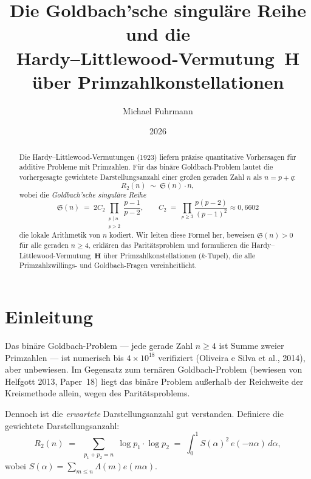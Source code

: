 \documentclass[12pt,a4paper]{amsart}
\theoremstyle{definition}
\newcommand{\eq}[1]{e\!\left(#1\right)}
\begin{document}
\title{Die Goldbach'sche singuläre Reihe und die\\
       Hardy--Littlewood-Vermutung~$\mathbf{H}$\\
       über Primzahlkonstellationen}

\author{Michael Fuhrmann}
\address{Specialist Mathematics Project, Build 80}
\date{2026}

\begin{abstract}
Die Hardy--Littlewood-Vermutungen (1923) liefern präzise quantitative
Vorhersagen für additive Probleme mit Primzahlen.  Für das binäre Goldbach-Problem
lautet die vorhergesagte gewichtete Darstellungsanzahl einer großen geraden
Zahl $n$ als $n = p + q$:
\[
  R_2(n) \;\sim\; \mathfrak{S}(n) \cdot n,
\]
wobei die \emph{Goldbach'sche singuläre Reihe}
\[
  \mathfrak{S}(n)
  \;=\; 2 C_2 \prod_{\substack{p \mid n \\ p > 2}} \frac{p-1}{p-2},
  \qquad
  C_2 \;=\; \prod_{p \geq 3} \frac{p(p-2)}{(p-1)^2} \approx 0{,}6602
\]
die lokale Arithmetik von $n$ kodiert.  Wir leiten diese Formel her,
beweisen $\mathfrak{S}(n) > 0$ für alle geraden $n \geq 4$, erklären
das Paritätsproblem und formulieren die Hardy--Littlewood-Vermutung~$\mathbf{H}$
über Primzahlkonstellationen ($k$-Tupel), die alle Primzahlzwillings-
und Goldbach-Fragen vereinheitlicht.
\end{abstract}

\maketitle
\tableofcontents

\section{Einleitung}

Das binäre Goldbach-Problem — jede gerade Zahl $n \geq 4$ ist Summe
zweier Primzahlen — ist numerisch bis $4 \times 10^{18}$ verifiziert
(Oliveira e Silva et al., 2014), aber unbewiesen.  Im Gegensatz zum
ternären Goldbach-Problem (bewiesen von Helfgott 2013, Paper~18) liegt
das binäre Problem außerhalb der Reichweite der Kreismethode allein,
wegen des Paritätsproblems.

Dennoch ist die \emph{erwartete} Darstellungsanzahl gut verstanden.
Definiere die gewichtete Darstellungsanzahl:
\[
  R_2(n) \;=\; \sum_{\substack{p_1 + p_2 = n}} \log p_1 \cdot \log p_2
  \;=\; \int_0^1 S(\alpha)^2\, \eq{-n\alpha}\, d\alpha,
\]
wobei $S(\alpha) = \sum_{m \leq n} \Lambda(m) \eq{m\alpha}$.
\end{document}
